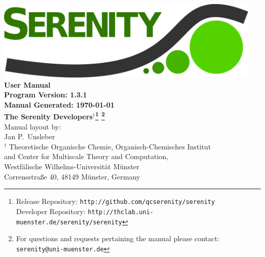 \documentclass[bibliography=totocnumbered,a4paper,10pt,oneside]{scrbook}
\begin{document}
\thispagestyle{empty}
\begin{center}
\vspace*{1cm}
\includegraphics[width=0.95\textwidth]{./figs/SerenityLogo.png}\\
\vspace{2cm}
{\LARGE\textbf{
User Manual
}}\\
\vspace{1cm}
{\large\textbf{
Program Version: 1.3.1\\
Manual Generated: \today
}}\\
\vspace{2cm}
{\large\textbf{
The Serenity Developers$^{\dagger}$\footnote{Release Repository: \texttt{http://github.com/qcserenity/serenity}\\
                                             Developer Repository: \texttt{http://thclab.uni-muenster.de/serenity/serenity}}
\footnote{For questions and requests pertaining the manual please contact:\\ \texttt{serenity@uni-muenster.de}}
}}\\
\vspace{2cm}
{\large Manual layout by: \\
Jan P.\ Unsleber
}
\\[2ex]

$^{\dagger}$ Theoretische Organische Chemie,
Organisch-Chemisches Institut \\
and Center for Multiscale Theory and Computation,\\
Westf\"alische Wilhelms-Universit\"at M\"unster\\
Corrensstra{\ss}e 40, 48149 M\"unster, Germany\\[2ex]

\vfill
\end{center}
\newpage
{}
\setcounter{page}{1}
\tableofcontents

\newpage
{}
\setcounter{page}{1}
\end{document}
